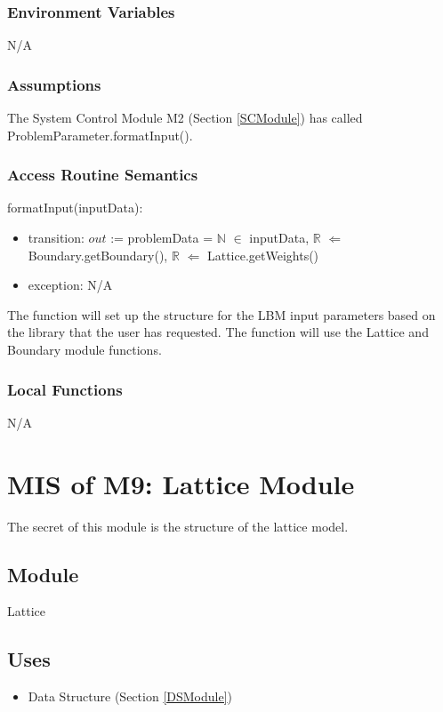 \documentclass[12pt, titlepage]{article}
\begin{document}
\subsubsection{Environment Variables}
N/A

\subsubsection{Assumptions}

The System Control Module M2 (Section \ref{SCModule}) has called ProblemParameter.formatInput().

\subsubsection{Access Routine Semantics}

\noindent formatInput(inputData):
\begin{itemize}
	\item transition: $out$ := problemData = $\mathbb{N}$ $\in$ inputData, $\mathbb{R}$ $\Leftarrow$ Boundary.getBoundary(), $\mathbb{R}$ $\Leftarrow$ Lattice.getWeights()
	\item exception: N/A
\end{itemize}

The function will set up the structure for the LBM input parameters based on the library that the user has requested. The function will use the Lattice and Boundary module functions.

\subsubsection{Local Functions}
N/A

\newpage

\section{MIS of M9: Lattice Module} \label{LAModule} 

The secret of this module is the structure of the lattice model.

\subsection{Module}

Lattice

\subsection{Uses}
\begin{itemize}
	\item Data Structure (Section \ref{DSModule})
\end{itemize}
\end{document}
